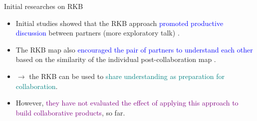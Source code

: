 \begin{frame}{Initial researches on RKB}
    \begin{itemize}
        \item <1-3> Initial studies showed that the RKB approach \textcolor{blue}{promoted productive
        discussion} between partners (more exploratory talk)
        \cite{Wunnasri2018ReciprocalUnderstanding}. 
        \item <2-3>The RKB map also \textcolor{blue}{encouraged the pair of partners to understand each other} based on the similarity of the individual post-collaboration map
        \cite{Wunnasri2018ReciprocalCollaboration}. 
        \item <3-> $\longrightarrow$ the RKB can be used to \textcolor{teal}{share understanding as preparation for
        collaboration}. 
        \item <4->However, \textcolor{purple}{they have not evaluated the effect of applying
        this approach to build collaborative products}, so far. 
    \end{itemize}
\end{frame}


